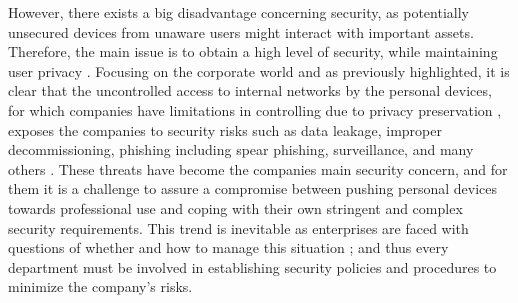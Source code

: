 \documentclass[a4paper,10pt,twocolumn,preprint,3p]{elsarticle}
\begin{document}

However, there exists a big disadvantage concerning security, as
potentially unsecured devices from unaware users might interact with
important assets. Therefore, the main issue is to obtain a high level
of security, while maintaining user privacy \cite{miller2012byod}.
Focusing on the corporate world and as previously highlighted,
it is clear that the uncontrolled access to internal networks by the
personal devices, for which companies have limitations in
controlling due to privacy preservation \cite{miller2012byod}, exposes the companies to security risks such as data
leakage, improper decommissioning, phishing including spear phishing, %
surveillance, and many
others \cite{lennon2012changing}. These threats have become the
companies main security concern, and for them it is a challenge to
assure a compromise between pushing personal devices towards
professional use and coping with their own stringent and complex
security requirements. This trend is inevitable as enterprises are
faced with questions of whether and how to manage this situation \cite{thomson2012byod}; and
thus every department must be involved in establishing security
policies and procedures to minimize the company's risks.
\end{document}
